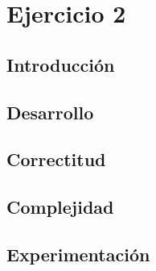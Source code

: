 
\section{Ejercicio 2}
\subsection{Introducción}

\subsection{Desarrollo}


\subsection{Correctitud}



\subsection{Complejidad}








\subsection{Experimentación}
